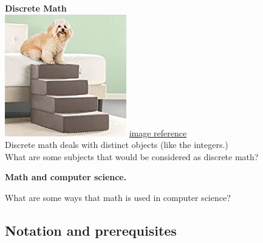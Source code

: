 \documentclass[12pt, oneside]{article}
\begin{document}
\begin{multicols}{2}
  {\bf Discrete Math}\\
  \includegraphics[scale=0.5]{../../resources/images/dog_stairs.jpg}
   \href{https://www.google.com/imgres?imgurl=https%3A%2F%2Fimages-na.ssl-images-amazon.com%2Fimages%2FI%2F41IAfR4glVL._AC_UL200_SR200%2C200_.jpg&imgrefurl=https%3A%2F%2Fwww.amazon.com%2FBest-Sellers-Pet-Supplies-Dog-Stairs-Steps%2Fzgbs%2Fpet-supplies%2F2975332011&tbnid=YdaajUVDeFbHTM&vet=10CEwQMyjwAWoXChMIkLO_4KeW9QIVAAAAAB0AAAAAEAc..i&docid=xqzoy3qBGJdNcM&w=200&h=200&q=dog%20bed%20stairs&ved=0CEwQMyjwAWoXChMIkLO_4KeW9QIVAAAAAB0AAAAAEAc}{image reference}\\
    Discrete math deals with distinct objects (like the integers.)\\
  What are some subjects that would be considered as discrete math?
  
\end{multicols}
\vfill

{\bf Math and computer science.}

What are some ways that math is used in computer science?

\vfill



\newpage


\subsection*{Notation and prerequisites}
\end{document}
